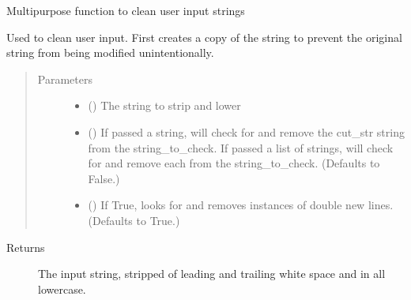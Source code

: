 \documentclass[a4paper,10pt,english]{sphinxmanual}
\begin{document}
\begin{fulllineitems}
\label{\detokenize{io_functions:io_functions.clean_str}}
Multipurpose function to clean user input strings

Used to clean user input. First creates a copy of the string to prevent
the original string from being modified unintentionally.
\begin{quote}\begin{description}
\item[{Parameters}] \leavevmode\begin{itemize}
\item {} 
 () \textendash{} The string to strip and lower

\item {} 
 () \textendash{} If passed a string, will check for and
remove the cut\_str string from the string\_to\_check. If passed a list
of strings, will check for and remove each from the string\_to\_check.
(Defaults to False.)

\item {} 
 () \textendash{} If True, looks for and removes instances
of double new lines.
(Defaults to True.)

\end{itemize}

\end{description}\end{quote}
\begin{description}
\item[{Returns}] \leavevmode
The input string, stripped of leading and trailing white space
and in all lowercase.

\end{description}

\end{fulllineitems}

\end{document}
